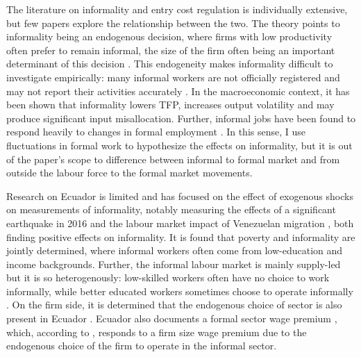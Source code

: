 \documentclass[11pt,a4paper]{article}\usepackage[]{graphicx}\usepackage[]{xcolor}
\begin{document}
The literature on informality and entry cost regulation is individually extensive, but few papers explore the relationship between the two. The theory points to informality being an endogenous decision, where firms with low productivity often prefer to remain informal, the size of the firm often being an important determinant of this decision \parencite{Delechat2020, MauricioPrado.2011, ElianeElBadaoui.2010}. This endogeneity makes informality difficult to investigate empirically: many informal workers are not officially registered and may not report their activities accurately \textcite{Oviedo.2009}. In the macroeconomic context, it has been shown that informality lowers TFP, increases output volatility and may produce significant input misallocation. Further, informal jobs have been found to respond heavily to changes in formal employment \parencite{Leyva.2020}. In this sense, I use fluctuations in formal work to hypothesize the effects on informality, but it is out of the paper's scope to difference between informal to formal market and from outside the labour force to the formal market movements.

Research on Ecuador is limited and has focused on the effect of exogenous shocks on measurements of informality, notably measuring the effects of a significant earthquake in 2016 \parencite{Mendoza.2020} and the labour market impact of Venezuelan migration \parencite{Olivieri.2022}, both finding positive effects on informality. It is found that poverty and informality are jointly determined, where informal workers often come from low-education and income backgrounds. Further, the informal labour market is mainly supply-led but it is so heterogenously: low-skilled workers often have no choice to work informally, while better educated workers sometimes choose to operate informally \parencite{Canelas.2019}. On the firm side, it is determined that the endogenous choice of sector is also present in Ecuador \textcite{Medvedev.2016}. Ecuador also documents a formal sector wage premium \textcite{MacIsaac.1997}, which, according to \textcite{ElianeElBadaoui.2010}, responds to a firm size wage premium due to the endogenous choice of the firm to operate in the informal sector. 
\end{document}
